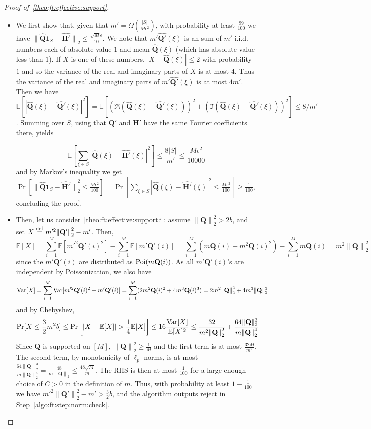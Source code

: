 \documentclass[11pt]{article}
\theoremstyle{definition}
\newcommand{\E}{\mathbb{E}}
\newcommand{\q}{\mathbf{Q}}
\newcommand{\h}{\mathbf{H}}
\newcommand{\eps}{\epsilon}
\newcommand{\abs}[1]{\lvert#1\rvert}
\newcommand{\norm}[1]{\lVert#1\rVert}
\newcommand{\Var}{\mathop{\textnormal{Var}}\nolimits}
\newcommand{\Poi}{\mathop{\textnormal{Poi}}\nolimits}
\newcommand{\eqdef}{\stackrel{{\mathrm {\footnotesize def}}}{=}}
\newcommand{\normtwo}[1]{{\norm{#1}}_2}
\renewcommand{\abs}[1]{\left\lvert #1 \right\rvert}
\newcommand{\reject}{\textsf{reject}\xspace}
\newcommand{\bigOmega}[1]{{\Omega\left( #1 \right)}}
\newcommand{\fourier}[1]{\widehat{#1}}
\begin{document}
\begin{proof}[Proof of~\cref{theo:ft:effective:support}]
\begin{itemize}
  \item We first show that, given that $m'=\bigOmega{\frac{\abs{S}}{M\eps^2}}$, with probability at least $\frac{99}{100}$ we have
    $
        \normtwo{\fourier{\q}\mathbf{1}_S-\fourier{\h'}} \leq \frac{\sqrt{M}\eps}{10}
    $.
	We note that $m'\fourier{\q'}(\xi)$ is an sum of $m'$ i.i.d. numbers each of absolute value $1$ and mean $\fourier{\q}(\xi)$ (which has absolute value less than $1$). If $X$ is one of these numbers, $|X-\fourier{\q}(\xi)| \leq 2$ with probability $1$ and so the variance of the real and imaginary parts of $X$ is at most $4$. Thus the variance of the real and imaginary  parts of $m'\fourier{\q'}(\xi)$ is at most $4m'$. Then we have
	$\E[|\fourier{\q}(\xi) - \fourier{\q'}(\xi)|^2]=\E[ (\Re (\fourier{\q}(\xi) - \fourier{\q'}(\xi)))^2 + (\Im ( \fourier{\q}(\xi) - \fourier{\q'}(\xi)))^2] \leq 8/m'$. Summing over $S$, using that $\q'$ and $\h'$ have the same Fourier coefficients there, yields
	
\[
    \E\left[ \sum_{\xi\in S} \abs{\fourier{\q}(\xi)-\fourier{\h'}(\xi)}^2 \right] 
	\leq \frac{8|S|}{m'}
    \leq \frac{M\eps^2}{10000}
\]
and by Markov's inequality we get 
$\Pr\left[ \normtwo{\fourier{\q}\mathbf{1}_S-\fourier{\h'}}^2 \leq \frac{M\eps^2}{100} \right] = \Pr\left[\sum_{\xi\in S} \abs{\fourier{\q}(\xi)-\fourier{\h'}(\xi)}^2 \leq \frac{M\eps^2}{100} \right] \geq \frac{1}{100}$,
 concluding the proof.


  \item Then, let us consider~\cref{theo:ft:effective:support:i}: assume $\normtwo{\q}^2 > 2b$, and set $X\eqdef m'^2\normtwo{\q'}^2 - m'$. Then, 
\[
  \E[ X ] = \sum_{i=1}^M \E[ m'^2\q'(i)^2 ] - \sum_{i=1}^M \E[ m'\q'(i) ] = \sum_{i=1}^M ( m\q(i)+m^2\q(i)^2) - \sum_{i=1}^M m\q(i)= m^2\normtwo{\q}^2
\]
since the $m'\q'(i)$ are distributed as $\Poi(m\q(i))$. As all $m'\q'(i)$'s are independent by Poissonization, we also have
\[
  \Var[ X ] = \sum_{i=1}^M \Var[ m'^2\q'(i)^2 - m'\q'(i) ] = \sum_{i=1}^M ( 2m^2\q(i)^2 + 4m^3\q(i)^3) 
  = 2m^2 \normtwo{\q}^2 + 4m^3 \norm{\q}_3^3
\]
and by Chebyshev,
\[
    \Pr[ X \leq \frac{3}{2}m^2b] \leq \Pr\left[ \abs{ X - \E[ X ] } > \frac{1}{4} \E[ X ] \right]
    \leq 16\frac{\Var[ X ]}{\E[ X ]^2}
    \leq \frac{32}{m^2\normtwo{\q}^2} + \frac{64 \norm{\q}_3^3}{m \normtwo{\q}^4 }
\]
Since $\q$ is supported on $[M]$, $\normtwo{\q}^2 \geq \frac{1}{M}$ and the first term is at most $\frac{32M}{m^2}$. The second term, by monotonicity of $\ell_p$-norms, is at most 
$\frac{64 \normtwo{\q}^3}{m \normtwo{\q}^4 } = \frac{48}{m \normtwo{\q} } \leq \frac{48\sqrt{M}}{m}$. The RHS is then at most $\frac{1}{100}$ for a large enough choice of $C>0$ in the definition of $m$. Thus, with probability at least $1-\frac{1}{100}$ we have $m'^2\normtwo{\q'}^2 - m' > \frac{3}{2}b$, and the algorithm outputs \reject in Step~\ref{algo:ft:step:norm:check}.


\end{itemize}
\end{proof}
\end{document}
